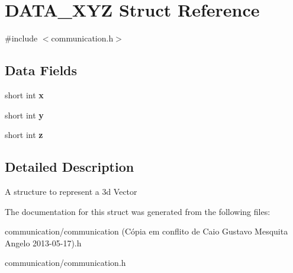 \hypertarget{structDATA__XYZ}{
\section{DATA\_\-XYZ Struct Reference}
\label{structDATA__XYZ}
}


{\ttfamily \#include $<$communication.h$>$}

\subsection*{Data Fields}
\begin{DoxyCompactItemize}
\item 
\hypertarget{structDATA__XYZ_a54c1596e9f9969fd9c21e8458024ecfb}{
short int {\bfseries x}}
\label{structDATA__XYZ_a54c1596e9f9969fd9c21e8458024ecfb}

\item 
\hypertarget{structDATA__XYZ_a94bbb1c889bf53eb6a5fffa2b39322cf}{
short int {\bfseries y}}
\label{structDATA__XYZ_a94bbb1c889bf53eb6a5fffa2b39322cf}

\item 
\hypertarget{structDATA__XYZ_a69e89ab0ec6e5d72fc5d54f62cc07fb5}{
short int {\bfseries z}}
\label{structDATA__XYZ_a69e89ab0ec6e5d72fc5d54f62cc07fb5}

\end{DoxyCompactItemize}


\subsection{Detailed Description}
A structure to represent a 3d Vector 

The documentation for this struct was generated from the following files:\begin{DoxyCompactItemize}
\item 
communication/communication (Cópia em conflito de Caio Gustavo Mesquita Angelo 2013-\/05-\/17).h\item 
communication/communication.h\end{DoxyCompactItemize}

